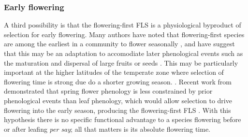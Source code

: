 \documentclass[11pt]{article}
\begin{document}
\subsubsection*{Early flowering}
\noindent A third possibility is that the flowering-first FLS is a physiological byproduct of selection for early flowering. Many authors have noted that flowering-first species are among the earliest in a community to flower seasonally \citep{}, and have suggest that this may be an adaptation to accomodiate later phenological events such as the maturation and dispersal of large fruits or seeds \citep{Li2016,Primack1987,Ettinger2018}. This may be particularly important at the higher latitudes of the temperate zone where selection of flowering time is strong due do a shorter growing season. . Recent work from \citet{Savage2019} demonstrated that spring flower phenology is less constrained by prior phenological events than leaf phenology, which would allow selection to drive flowering into the early season, producing the flowering-first FLS . With this hypothesis there is no specific functional advantage to a species flowering before or after leafing \emph{per say}; all that matters is its absolute flowering time.
\end{document}
